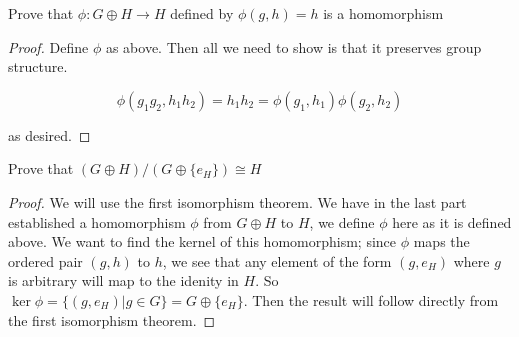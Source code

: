 \documentclass[11pt]{homework}
\begin{document}
\begin{alphaparts}
    \questionpart
    Prove that $\phi: G \oplus H \to H$ defined by $\phi(g,h) = h$ is a homomorphism 

    \begin{proof}
        Define $\phi$ as above. Then all we need to show is that it preserves group structure. 

        \[\phi(g_1 g_2, h_1 h_2) = h_1 h_2 = \phi(g_1, h_1) \phi(g_2, h_2)\]

        as desired. 
    \end{proof}

    \questionpart 
    Prove that $(G \oplus H) / (G \oplus \{e_H\}) \cong H$

    \begin{proof}
        We will use the first isomorphism theorem. We have in the last part established a homomorphism $\phi$ from 
        $G \oplus H$ to $H$, we define $\phi$ here as it is defined above. We want to find the kernel of this homomorphism; 
        since $\phi$ maps the ordered pair $(g, h)$ to $h$, we see that any element of the form $(g, e_H)$ where 
        $g$ is arbitrary will map to the idenity in $H$. So $\ker \phi = \{(g, e_H) | g \in G \} = G \oplus \{e_H\}$. 
        Then the result will follow directly from the first isomorphism theorem. 
    \end{proof}


\end{alphaparts}
\end{document}
